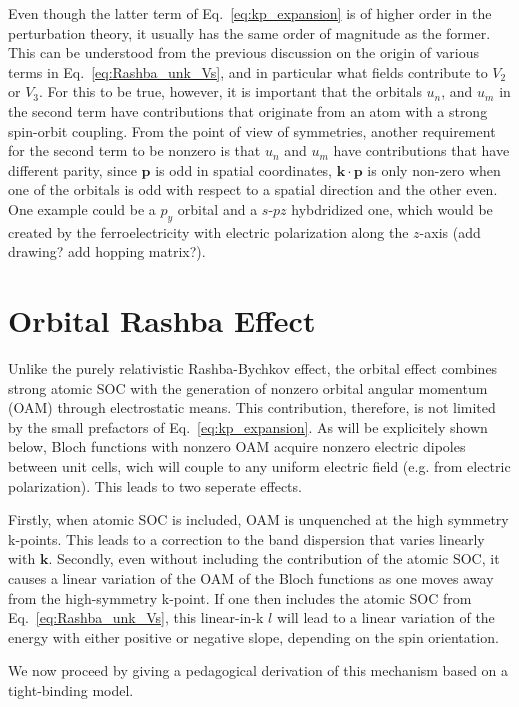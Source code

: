 Even though the latter term of Eq.~\ref{eq:kp_expansion} is of higher order in the perturbation theory, it usually has the same order of magnitude as the former. This can be understood from the previous discussion on the origin of various terms in Eq.~\ref{eq:Rashba_unk_Vs}, and in particular what fields contribute to $V_2$ or $V_3$. 
For this to be true, however, it is important that the orbitals $u_n$, and $u_m$ in the second term have contributions that originate from an atom with a strong spin-orbit coupling. From the point of view of symmetries, another requirement for the second term to be nonzero is that $u_n$ and $u_m$ have contributions that have different parity, since $\bm{p}$ is odd in spatial coordinates, $\bm{k} \cdot \bm{p}$ is only non-zero when one of the orbitals is odd with respect to a spatial direction and the other even. One example could be a $p_y$ orbital and a $s$-$pz$ hybdridized one, which would be created by the ferroelectricity with electric polarization along the $z$-axis (add drawing? add hopping matrix?).

\section{Orbital Rashba Effect}
Unlike the purely relativistic Rashba-Bychkov effect, the orbital effect combines strong atomic SOC with the generation of nonzero orbital angular momentum (OAM) through electrostatic means.
This contribution, therefore, is not limited by the small prefactors of Eq.~\ref{eq:kp_expansion}. As will be explicitely shown below, Bloch functions with nonzero OAM acquire nonzero electric dipoles between unit cells\cite{Park2011}, wich will couple to any uniform electric field (e.g. from electric polarization). This leads to two seperate effects.

Firstly, when atomic SOC is included, OAM is unquenched at the high symmetry k-points. This leads to a correction to the band dispersion that varies linearly with $\bm{k}$. Secondly, even without including the contribution of the atomic SOC, it causes a linear variation of the OAM of the Bloch functions as one moves away from the high-symmetry k-point. If one then includes the atomic SOC from Eq.~\ref{eq:Rashba_unk_Vs}, this linear-in-k $l$ will lead to a linear variation of the energy with either positive or negative slope, depending on the spin orientation.

We now proceed by giving a pedagogical derivation of this mechanism based on a tight-binding model.

